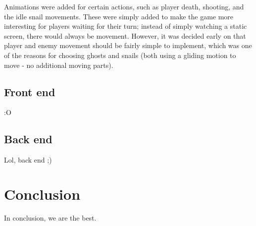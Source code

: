 \documentclass{article}
\begin{document}
Animations were added for certain actions, such as player death, shooting, and the idle snail movements. These were simply added to make the game more interesting for players waiting for their turn; instead of simply watching a static screen, there would always be movement. However, it was decided early on that player and enemy movement should be fairly simple to implement, which was one of the reasons for choosing ghosts and snails (both using a gliding motion to move - no additional moving parts).

\subsection{Front end}
:O
\subsection{Back end}
Lol, back end ;)

\section{Conclusion}
In conclusion, we are the best.
\end{document}
